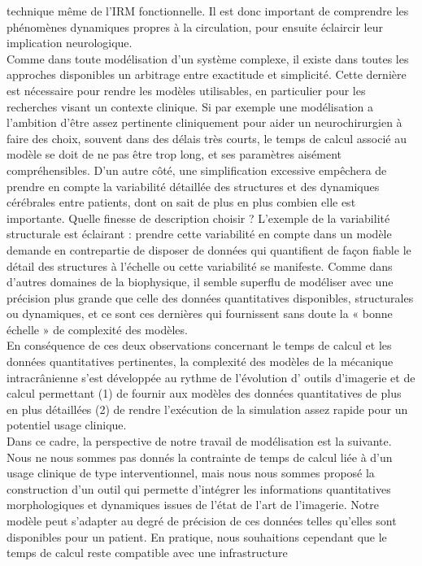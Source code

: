 technique même de l'IRM fonctionnelle. Il est donc important de comprendre les phénomènes
dynamiques propres à la circulation, pour ensuite éclaircir leur implication neurologique.\\
Comme dans toute modélisation d'un système complexe, il existe dans toutes les approches
disponibles un arbitrage entre exactitude et simplicité. Cette dernière est nécessaire pour rendre les
modèles utilisables, en particulier pour les recherches visant un contexte clinique. Si par exemple une
modélisation a l'ambition d'être assez pertinente cliniquement pour aider un neurochirurgien à faire
des choix, souvent dans des délais très courts, le temps de calcul associé au modèle se doit de ne pas
être trop long, et ses paramètres aisément compréhensibles. D'un autre côté, une simplification
excessive empêchera de prendre en compte la variabilité détaillée des structures et des dynamiques
cérébrales entre patients, dont on sait de plus en plus combien elle est importante. Quelle finesse de
description choisir ? L'exemple de la variabilité structurale est éclairant : prendre cette variabilité en
compte dans un modèle demande en contrepartie de disposer de données qui quantifient de façon
fiable le détail des structures à l'échelle ou cette variabilité se manifeste. Comme dans d'autres
domaines de la biophysique, il semble superflu de modéliser avec une précision plus grande que celle des données quantitatives disponibles, structurales ou dynamiques, et ce sont ces dernières qui
fournissent sans doute la « bonne échelle » de complexité des modèles.\\
En conséquence de ces deux observations concernant le temps de calcul et les données
quantitatives pertinentes, la complexité des modèles de la mécanique intracrânienne s'est développée
au rythme de l'évolution d' outils d'imagerie et de calcul permettant (1) de fournir aux modèles des
données quantitatives de plus en plus détaillées (2) de rendre l'exécution de la simulation assez rapide
pour un potentiel usage clinique.\\
Dans ce cadre, la perspective de notre travail de modélisation est la suivante. Nous ne nous
sommes pas donnés la contrainte de temps de calcul liée à d'un usage clinique de type interventionnel,
mais nous nous sommes proposé la construction d'un outil qui permette d'intégrer les informations
quantitatives morphologiques et dynamiques issues de l'état de l'art de l'imagerie. Notre modèle peut
s'adapter au degré de précision de ces données telles qu’elles sont disponibles pour un patient. En
pratique, nous souhaitions cependant que le temps de calcul reste compatible avec une infrastructure
